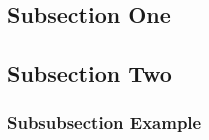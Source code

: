 \documentclass[
	a4paper, %
	12pt, %
	unnumberedsections, %
	twoside, %
]{LTJournalArticle}
\begin{document}

\subsection{Subsection One}


\subsection{Subsection Two}


\subsubsection{Subsubsection Example}
\end{document}
